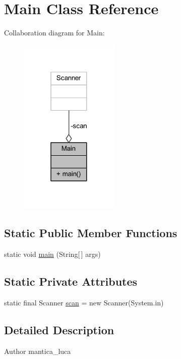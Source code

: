 \hypertarget{classmain_1_1_main}{}\section{Main Class Reference}
\label{classmain_1_1_main}


Collaboration diagram for Main\+:
\nopagebreak
\begin{figure}[H]
\begin{center}
\leavevmode
\includegraphics[width=135pt]{classmain_1_1_main__coll__graph}
\end{center}
\end{figure}
\subsection*{Static Public Member Functions}
\begin{DoxyCompactItemize}
\item 
static void \mbox{\hyperlink{classmain_1_1_main_a8b260eecbaabcef8473fd87ada040682}{main}} (String\mbox{[}$\,$\mbox{]} args)
\end{DoxyCompactItemize}
\subsection*{Static Private Attributes}
\begin{DoxyCompactItemize}
\item 
static final Scanner \mbox{\hyperlink{classmain_1_1_main_ad2b26d92ead66c3a1c4e4d4d77394aba}{scan}} = new Scanner(System.\+in)
\end{DoxyCompactItemize}


\subsection{Detailed Description}
\begin{DoxyAuthor}{Author}
mantica\+\_\+luca 
\end{DoxyAuthor}


